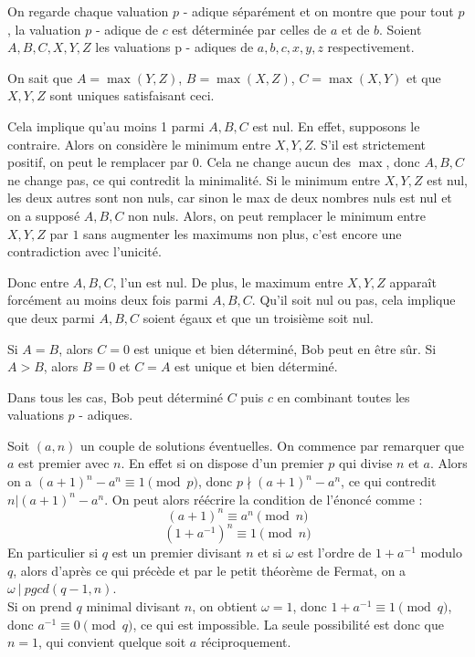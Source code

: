 \begin{sol}
On regarde chaque valuation $p$ - adique séparément et on montre que pour tout $p$, la valuation $p$ - adique de $c$ est déterminée par celles de $a$ et de $b$. Soient $A, B, C, X, Y, Z$ les valuations p - adiques de $a, b, c, x, y, z$ respectivement.

On sait que $A = \max(Y, Z)$, $B = \max(X, Z)$, $C = \max(X, Y)$ et que $X, Y, Z$ sont uniques satisfaisant ceci.

Cela implique qu'au moins 1 parmi $A, B, C$ est nul. En effet, supposons le contraire. Alors on considère le minimum entre $X, Y, Z$. S'il est strictement positif, on peut le remplacer par $0$. Cela ne change aucun des $\max$, donc $A, B, C$ ne change pas, ce qui contredit la minimalité. Si le minimum entre $X, Y, Z$ est nul, les deux autres sont non nuls, car sinon le max de deux nombres nuls est nul et on a supposé $A, B, C$ non nuls. Alors, on peut remplacer le minimum entre $X, Y, Z$ par $1$ sans augmenter les maximums non plus, c'est encore une contradiction avec l'unicité.

Donc entre $A, B, C$, l'un est nul. De plus, le maximum entre $X, Y, Z$ apparaît forcément au moins deux fois parmi $A, B, C$. Qu'il soit nul ou pas, cela implique que deux parmi $A, B, C$ soient égaux et que un troisième soit nul.

Si $A = B$, alors $C = 0$ est unique et bien déterminé, Bob peut en être sûr.
Si $A > B$, alors $B = 0$ et $C = A$ est unique et bien déterminé.

Dans tous les cas, Bob peut déterminé $C$ puis $c$ en combinant toutes les valuations $p$ - adiques.
\end{sol}


\begin{sol}
Soit $(a, n)$ un couple de solutions éventuelles. On commence par remarquer que $a$ est premier avec $n$. En effet si on dispose d'un premier $p$ qui divise $n$ et $a$. Alors on a $(a + 1)^n - a^n \equiv 1\pmod p $, donc $p\nmid (a + 1)^n - a^n$, ce qui contredit $n|(a + 1)^n - a^n$. On peut alors réécrire la condition de l'énoncé comme :
$$(a + 1)^n\equiv a^n \pmod n $$
$$(1 + a^{ - 1})^n\equiv 1 \pmod n$$
En particulier si $q$ est un premier divisant $n$ et si $\omega$ est l'ordre de $1 + a^{ - 1}$ modulo $q$, alors d'après ce qui précède et par le petit théorème de Fermat, on a $\omega ~|~ pgcd(q - 1, n)$. \\
Si on prend $q$ minimal divisant $n$, on obtient $\omega = 1$, donc $1 + a^{ - 1}\equiv 1\pmod q$, donc $a^{ - 1}\equiv 0\pmod q$, ce qui est impossible. La seule possibilité est donc que $n = 1$, qui convient quelque soit $a$ réciproquement.
\end{sol}


